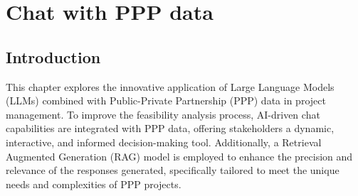\chapter{Chat with PPP data}

\section{Introduction}
This chapter explores the innovative application of Large Language Models (LLMs) combined with Public-Private Partnership (PPP) data in project management. To improve the feasibility analysis process, AI-driven chat capabilities are integrated with PPP data, offering stakeholders a dynamic, interactive, and informed decision-making tool. Additionally, a Retrieval Augmented Generation (RAG) model is employed to enhance the precision and relevance of the responses generated, specifically tailored to meet the unique needs and complexities of PPP projects.
